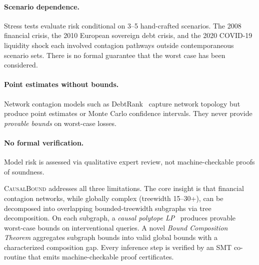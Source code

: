 \documentclass[11pt,a4paper]{article}
\newcommand{\CausalBound}{\textsc{CausalBound}}
\begin{document}
\paragraph{Scenario dependence.} Stress tests evaluate risk conditional on 3--5 hand-crafted scenarios. The 2008 financial crisis, the 2010 European sovereign debt crisis, and the 2020 COVID-19 liquidity shock each involved contagion pathways outside contemporaneous scenario sets. There is no formal guarantee that the worst case has been considered.

\paragraph{Point estimates without bounds.} Network contagion models such as DebtRank~\citep{battiston2012debtrank} capture network topology but produce point estimates or Monte Carlo confidence intervals. They never provide \emph{provable bounds} on worst-case losses.

\paragraph{No formal verification.} Model risk is assessed via qualitative expert review, not machine-checkable proofs of soundness.

\CausalBound{} addresses all three limitations. The core insight is that financial contagion networks, while globally complex (treewidth 15--30+), can be decomposed into overlapping bounded-treewidth subgraphs via tree decomposition. On each subgraph, a \emph{causal polytope LP}~\citep{balke1997bounds} produces provable worst-case bounds on interventional queries. A novel \emph{Bound Composition Theorem} aggregates subgraph bounds into valid global bounds with a characterized composition gap. Every inference step is verified by an SMT co-routine that emits machine-checkable proof certificates.
\end{document}
